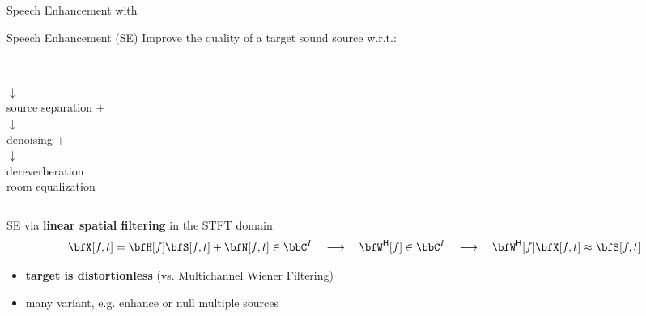 \begin{frame}{Speech Enhancement with \dechorate \hfill\faComments}

    \begin{mydefblock}{Speech Enhancement (SE)}
        Improve the quality of a \alert{target} sound source w.r.t.:
        \begin{columns}[T,onlytextwidth]
                \centering
                \\$\downarrow$
                \\source separation
            \centering
            +
                \centering
                \\$\downarrow$
                \\denoising
                \centering
                +
                \centering
                \\$\downarrow$
                \\dereverberation
                \\room equalization
        \end{columns}
    \end{mydefblock}

    \pause[3]
    \begin{block}{}
        SE via \textbf{linear spatial filtering} in the STFT domain
        \begin{equation*}
            \bfX[f,t] = \bfH[f]\bfS[f,t] + \bfN[f,t]  \in \bbC^{I}
            \quad\longrightarrow
            \quad\khermitian{\bfW}[f] \in \bbC^{I}
            \quad\longrightarrow
            \quad\khermitian{\bfW}[f] \bfX[f,t] \approx \bfS[f,t]
        \end{equation*}

        \vspace{-3mm}
        \begin{itemize}
            \item \textbf{target is distortionless} (vs. Multichannel Wiener Filtering)
            \item many variant, e.g. enhance or null multiple sources~\cite{gannot2017consolidated}
        \end{itemize}
    \end{block}


\end{frame}
